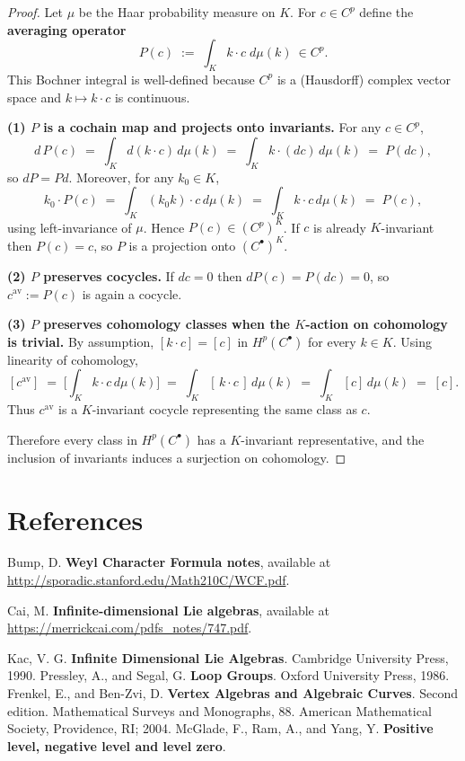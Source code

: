 \documentclass[12pt]{article}
\begin{document}
\begin{proof}
    Let $\mu$ be the Haar probability measure on $K$. For $c\in C^p$ define the
    \textbf{averaging operator}
    \[
        P(c)\;:=\;\int_{K} k\cdot c\; d\mu(k)\ \in C^p.
    \]
    This Bochner integral is well-defined because $C^p$ is a (Hausdorff) complex
    vector space and $k\mapsto k\cdot c$ is continuous.

    \smallskip

    \textbf{(1) $P$ is a cochain map and projects onto invariants.}
    For any $c\in C^p$,
    \[
        d\,P(c)\;=\;\int_K d(k\cdot c)\,d\mu(k)\;=\;\int_K k\cdot (dc)\,d\mu(k)\;=\;P(dc),
    \]
    so $dP=Pd$. Moreover, for any $k_0\in K$,
    \[
        k_0\cdot P(c)\;=\;\int_K (k_0k)\cdot c\,d\mu(k)\;=\;\int_K k\cdot c\,d\mu(k)\;=\;P(c),
    \]
    using left-invariance of $\mu$. Hence $P(c)\in (C^p)^K$. If $c$ is already
    $K$-invariant then $P(c)=c$, so $P$ is a projection onto $(C^\bullet)^K$.

    \smallskip

    \textbf{(2) $P$ preserves cocycles.}
    If $dc=0$ then $dP(c)=P(dc)=0$, so $c^{\mathrm{av}}:=P(c)$ is again a cocycle.

    \smallskip

    \textbf{(3) $P$ preserves cohomology classes when the $K$-action on cohomology is trivial.}
    By assumption, $[k\cdot c]=[c]$ in $H^p(C^\bullet)$ for every $k\in K$. Using linearity
    of cohomology,
    \[
        [c^{\mathrm{av}}]\;=\;\Big[\int_K k\cdot c\,d\mu(k)\Big]
        \;=\;\int_K [\,k\cdot c\,]\,d\mu(k)
        \;=\;\int_K [c]\,d\mu(k)
        \;=\;[c].
    \]
    Thus $c^{\mathrm{av}}$ is a $K$-invariant cocycle representing the same class as $c$.

    Therefore every class in $H^p(C^\bullet)$ has a $K$-invariant representative,
    and the inclusion of invariants induces a surjection on cohomology.
\end{proof}


\section{References}
\begin{enumerate}
     Bump, D. \textbf{Weyl Character Formula notes}, available at \url{http://sporadic.stanford.edu/Math210C/WCF.pdf}.

     Cai, M. \textbf{Infinite-dimensional Lie algebras}, available at \url{https://merrickcai.com/pdfs_notes/747.pdf}.

     Kac, V. G. \textbf{Infinite Dimensional Lie Algebras}. Cambridge University Press, 1990.
     Pressley, A., and Segal, G. \textbf{Loop Groups}. Oxford University Press, 1986.
     Frenkel, E., and Ben-Zvi, D. \textbf{Vertex Algebras and Algebraic Curves}. Second edition. Mathematical Surveys and Monographs, 88. American Mathematical Society, Providence, RI; 2004.
     McGlade, F., Ram, A., and Yang, Y. \textbf{Positive level, negative level and level zero}.
\end{enumerate}
\end{document}
